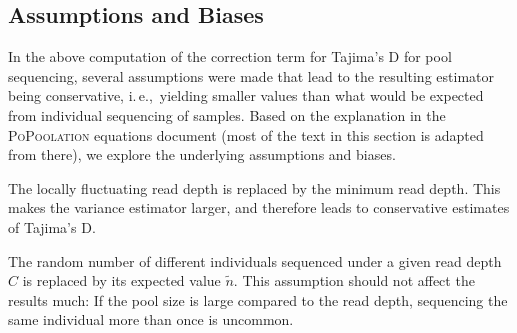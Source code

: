 \documentclass[letterpaper,fontsize=9pt,DIV=12]{scrartcl}
\newcommand\toolname{\textsc}
\newcommand{\ie}{i.\,e.,~}
\begin{document}



\subsection{Assumptions and Biases}
\label{supp:sec:TajimaD:sub:AssumptionsBiases}

In the above computation of the correction term for Tajima's D for pool sequencing,
several assumptions were made that lead to the resulting estimator being conservative,
\ie yielding smaller values than what would be expected from individual sequencing of samples.
Based on the explanation in the \toolname{PoPoolation} equations document (most of the text in this section is adapted from there), we explore the underlying assumptions and biases.

The locally fluctuating read depth is replaced by the minimum read depth.
This makes the variance estimator larger, and therefore leads to conservative estimates of Tajima's D.

The random number of different individuals sequenced under a given read depth $C$
is replaced by its expected value $\tilde{n}$.
This assumption should not affect the results much:
If the pool size is large compared to the read depth, sequencing the same individual more than once is uncommon.
\end{document}
